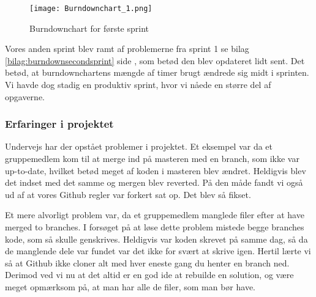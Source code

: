 \begin{figure}[h]
    \caption{Burndownchart for første sprint}
    \centering
        \texttt{[image: Burndownchart\_1.png]}
    \label{fig:burndownfirstsprint}
\end{figure}

Vores anden sprint blev ramt af problemerne fra sprint 1 se bilag \ref{bilag:burndownsecondsprint} side \pageref{bilag:burndownsecondsprint}, som betød den blev opdateret lidt sent.
Det betød, at burndownchartens mængde af timer brugt ændrede sig midt i sprinten.
Vi havde dog stadig en produktiv sprint, hvor vi nåede en større del af opgaverne.



\subsubsection{Erfaringer i projektet}

Undervejs har der opstået problemer i projektet.
Et eksempel var da et gruppemedlem kom til at merge ind på masteren med en branch, som ikke var up-to-date, hvilket betød meget af koden i masteren blev ændret.
Heldigvis blev det indset med det samme og mergen blev reverted.
På den måde fandt vi også ud af at vores Github regler var forkert sat op.
Det blev så fikset.

Et mere alvorligt problem var, da et gruppemedlem manglede filer efter at have merged to branches.
I forsøget på at løse dette problem mistede begge branches kode, som så skulle genskrives.
Heldigvis var koden skrevet på samme dag, så da de manglende dele var fundet var det ikke for svært at skrive igen.
Hertil lærte vi så at Github ikke cloner alt med hver eneste gang du henter en branch ned.
Derimod ved vi nu at det altid er en god ide at rebuilde en solution, og være meget opmærksom på, at man har alle de filer, som man bør have.